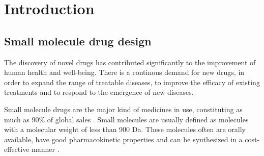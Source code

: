\chapter{Introduction\label{chap:introduction}}

\section{Small molecule drug design\label{sec:drug-design}} The discovery of novel drugs has
contributed significantly to the improvement of human health and well-being. There is a continous
demand for new drugs, in order to expand the range of treatable diseases, to improve the efficacy of
existing treatments and to respond to the emergence of new diseases.

Small molecule drugs are the major kind of medicines in use, constituting as much as 90\% of global
sales \citep{makurvetBiologicsVsSmall2021}. Small molecules are usually defined as molecules with a
molecular weight of less than 900 Da. These molecules often are orally available, have good
pharmacokinetic properties and can be synthesized in a cost-effective manner \citep{todo}.

